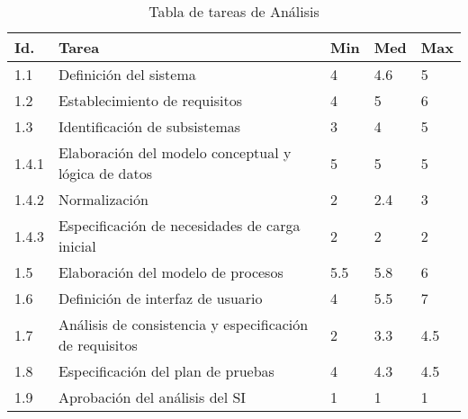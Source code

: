 \documentclass[11pt,a4paper,spanish,twoside]{report}
\begin{document}
\begin{table}[!h]
\centering
  \begin{tabular}{|p{0.8cm}||p{8cm}||p{0.75cm}|p{0.75cm}|p{0.75cm}|}
    \hline
    \textbf{Id.} & \textbf{Tarea} & \textbf{Min} &
    \textbf{Med} & \textbf{Max}\\
    \hline \hline
    1.1 & Definición del sistema & 4 & 4.6 & 5\\ 
    \hline
    1.2 & Establecimiento de requisitos & 4 & 5 & 6\\
    \hline
    1.3 & Identificación de subsistemas & 3 & 4 & 5\\
    \hline
    1.4.1 & Elaboración del modelo conceptual y lógica de datos & 5 & 5 & 5\\
    \hline
    1.4.2 & Normalización & 2 & 2.4 & 3 \\
    \hline
    1.4.3 & Especificación de necesidades de carga inicial & 2 & 2 & 2\\
    \hline
    1.5 & Elaboración del modelo de procesos & 5.5 & 5.8 & 6\\
    \hline
    1.6 & Definición de interfaz de usuario & 4 & 5.5 & 7\\
    \hline
    1.7 & Análisis de consistencia y especificación de requisitos & 2 & 3.3 & 4.5\\
    \hline
    1.8 & Especificación del plan de pruebas & 4 & 4.3 & 4.5\\
    \hline
    1.9 & Aprobación del análisis del SI & 1 & 1 & 1\\
    \hline
  \end{tabular}
  \caption{Tabla de tareas de Análisis} \label{Tab:tareas1}
\end{table}
\end{document}
